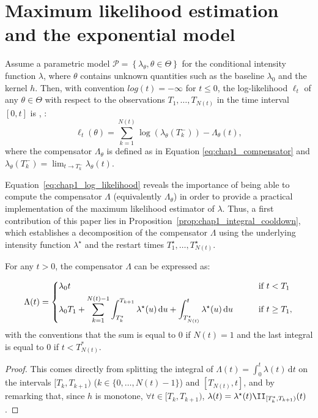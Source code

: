 \section{Maximum likelihood estimation and the exponential model}
\label{sec:chap1_mle}

Assume a parametric model $\mathcal P = \left\{ \lambda_\theta, \theta \in \Theta \right\}$ for the conditional intensity function $\lambda$, where $\theta$ contains unknown quantities such as the baseline $\lambda_0$ and the kernel $h$.
Then, with convention $log(t) = -\infty$ for $t\leq0$, the log-likelihood $\ell_t$ of any $\theta \in \Theta$ with respect to the observations $T_1,\ldots, T_{N(t)}$ in the time interval $[0,t]$ is \parencite[Proposition 7.2.III.]{DaleyV1}, \parencite{Ozaki1979}:
\begin{equation}\label{eq:chap1_log_likelihood}
    \ell_t(\theta) = \sum_{k=1}^{N(t)}{\log{(\lambda_\theta(T_k^-))}} - \Lambda_\theta(t),
\end{equation}
where the compensator $\Lambda_\theta$ is defined as in Equation \eqref{eq:chap1_compensator} and $\lambda_\theta(T_k^-) = \lim_{t \to T_k^-} \lambda_\theta(t)$.

Equation~\eqref{eq:chap1_log_likelihood} reveals the importance of being able to compute the compensator $\Lambda$ (equivalently $\Lambda_\theta$) in order to provide a practical implementation of the maximum likelihood estimator of $\lambda$.
Thus, a first contribution of this paper lies in Proposition~\ref{prop:chap1_integral_cooldown}, which establishes a decomposition of the compensator $\Lambda$ using the underlying intensity function $\lambda^\star$ and the restart times $T_{1}^\star,\ldots, T_{N(t)}^\star$.

\begin{proposition}\label{prop:chap1_integral_cooldown}
For any $t>0$, the compensator $\Lambda$ can be expressed as:

\begin{equation}\label{eq:chap1_compensator_general}
\Lambda(t) =
\begin{dcases}
    \lambda_0 t &\text{\qquad if $t<T_1$}\\
    \lambda_0 T_1 + \sum_{k=1}^{{N(t)-1}}{\int_{T_{k}^\star}^{T_{k+1}}{\lambda^\star(u)\,\mathrm{d}u}} + \int_{T_{N(t)}^\star}^{t}{\lambda^\star(u)\,\mathrm{d}u} &\text{\qquad if $t\geq T_1$},
\end{dcases}
\end{equation}
with the conventions that the sum is equal to $0$ if ${N(t)} = 1$ and the last integral is equal to $0$ if $t < T_{N(t)}^*$.
\end{proposition}
\begin{proof}
This comes directly from splitting the integral of $\Lambda(t) = \int_{0}^{t}{\lambda(t)\,\mathrm{d}t}$ on the intervals $[T_k, T_{k+1})$ ($k \in \{ 0, \dots, N(t)-1 \}$) and $[T_{N(t)}, t]$, and by remarking that, since $h$ is monotone, $\forall t\in[T_k, T_{k+1})$, $\lambda(t) = \lambda^\star(t)\II_{[T_k^*,T_{k+1})}(t)$.

\end{proof}

